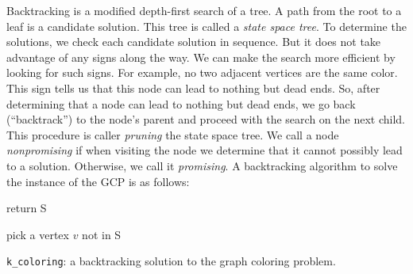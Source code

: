 \documentclass{article}
\begin{document}
Backtracking is a modified depth-first search of a tree.  A path from the root to a leaf is a candidate solution. This tree is called a \emph{state space tree}. To determine the solutions, we check each candidate solution in sequence. But it does not take advantage of any signs along the way. We can make the search more efficient by looking for such signs. For example, no two adjacent vertices are the same color. This sign tells us that this node can lead to nothing but dead ends. So, after determining that a node can lead to nothing but dead ends, we go back (``backtrack'') to the node's parent and proceed with the search on the next child. This procedure is caller \emph{pruning} the state space tree.  We call a node \emph{nonpromising} if when visiting the node we determine that  it cannot possibly lead to a solution. Otherwise, we call it \emph{promising}.  
A backtracking algorithm to solve the instance of the GCP is as follows: 
\begin{algorithm}[H]
\DontPrintSemicolon %
 {
    return S\;
} {
 	pick a vertex $v$ not in S\;
 
}
\caption{{\texttt{k\_coloring}:} a backtracking solution to the graph coloring problem.}
\label{algo:coloring}
\end{algorithm}







\end{document}
